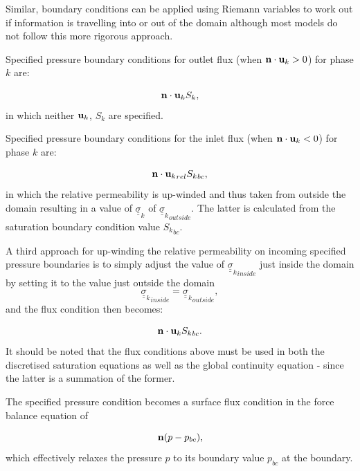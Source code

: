 Similar, boundary conditions can be applied using Riemann
variables to work out if information is travelling into
or out of the domain although most models do not follow this
more rigorous approach.

Specified pressure boundary conditions for outlet
flux (when ${\bf n}\cdot {\bf u}_k>0$) for phase $k$ are:

\begin{equation}
{\bf n}\cdot {\bf u}_k {S_k},
\end{equation}
in which neither ${\bf u}_k$, ${S_k}$ are specified.

Specified pressure boundary conditions for the inlet
flux (when ${\bf n}\cdot {\bf u}_k<0$) for phase $k$ are:

\begin{equation}
{\bf n}\cdot {{\bf u}_k}_{rel} {S_k}_{bc},
\label{pipe-flux-adjust-rel}
\end{equation}
in which the relative permeability is up-winded and thus taken
from outside the domain resulting in a value of ${\underline {\underline \sigma}}_k$ of
${{\underline {\underline \sigma}}_k}_{outside}$. The latter is calculated from
the saturation boundary condition value ${S_k}_{bc}$.



A third approach for up-winding the
relative permeability on incoming specified pressure
boundaries is to simply adjust the value of ${{\underline {\underline \sigma}}_k}_{inside}$
just inside the domain by setting it to the
value just outside the domain
\begin{equation}
{{\underline {\underline \sigma}}_k}_{inside}={{\underline {\underline \sigma}}_k}_{outside} ,
\end{equation}
and the flux
condition then becomes:


\begin{equation}
{\bf n}\cdot{{\bf u}_k} {S_k}_{bc}.
\end{equation}
It should be noted that the flux conditions above
must be used in both the discretised saturation equations
as well as the global continuity equation - since the latter
is a summation of the former.

The specified pressure condition becomes a surface flux
condition in the force balance equation of

\begin{equation}
{\bf n} (p-p_{bc}),
\end{equation}
which effectively relaxes the pressure $p$ to its boundary
value $p_{bc}$ at the boundary.



